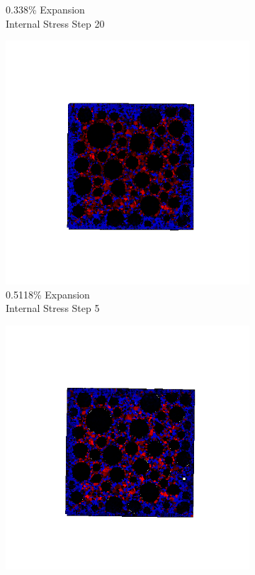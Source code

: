 \begin{figure}[ht!]
\begin{subfigure}{.25\textwidth}
      \caption{0.338\% Expansion\\Internal Stress Step 20}
    \end{subfigure}
    \begin{subfigure}{.25\textwidth}
      \centering
      \includegraphics[width=1.0\linewidth]{Files/exp_3D/DEF/A30X-5C_3_s5.png}
      \caption{0.5118\% Expansion\\Internal Stress Step 5}
    \end{subfigure}%
    \begin{subfigure}{.25\textwidth}
      \centering
      \includegraphics[width=1.0\linewidth]{Files/exp_3D/DEF/A30X-5C_3_s10.png}

\end{subfigure}
\end{figure}
